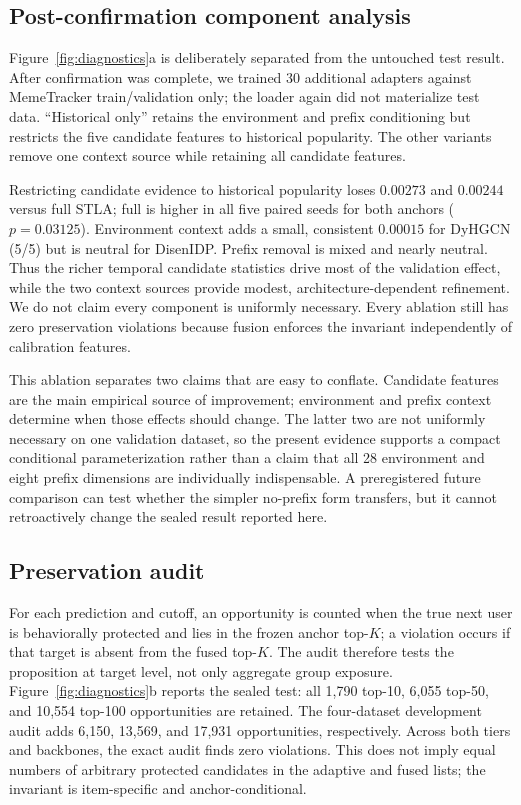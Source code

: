 \documentclass[sigconf,anonymous,review]{acmart}
\newcommand{\method}{\textsc{STLA}\xspace}
\begin{document}
\subsection{Post-confirmation component analysis}
Figure~\ref{fig:diagnostics}a is deliberately separated from the untouched test result. After confirmation was complete, we trained 30 additional adapters against MemeTracker train/validation only; the loader again did not materialize test data. ``Historical only'' retains the environment and prefix conditioning but restricts the five candidate features to historical popularity. The other variants remove one context source while retaining all candidate features.

Restricting candidate evidence to historical popularity loses $0.00273$ and $0.00244$ versus full \method; full is higher in all five paired seeds for both anchors ($p=0.03125$). Environment context adds a small, consistent $0.00015$ for DyHGCN (5/5) but is neutral for DisenIDP. Prefix removal is mixed and nearly neutral. Thus the richer temporal candidate statistics drive most of the validation effect, while the two context sources provide modest, architecture-dependent refinement. We do not claim every component is uniformly necessary. Every ablation still has zero preservation violations because fusion enforces the invariant independently of calibration features.

This ablation separates two claims that are easy to conflate. Candidate features are the main empirical source of improvement; environment and prefix context determine when those effects should change. The latter two are not uniformly necessary on one validation dataset, so the present evidence supports a compact conditional parameterization rather than a claim that all 28 environment and eight prefix dimensions are individually indispensable. A preregistered future comparison can test whether the simpler no-prefix form transfers, but it cannot retroactively change the sealed result reported here.

\subsection{Preservation audit}
For each prediction and cutoff, an opportunity is counted when the true next user is behaviorally protected and lies in the frozen anchor top-$K$; a violation occurs if that target is absent from the fused top-$K$. The audit therefore tests the proposition at target level, not only aggregate group exposure. Figure~\ref{fig:diagnostics}b reports the sealed test: all 1,790 top-10, 6,055 top-50, and 10,554 top-100 opportunities are retained. The four-dataset development audit adds 6,150, 13,569, and 17,931 opportunities, respectively. Across both tiers and backbones, the exact audit finds zero violations. This does not imply equal numbers of arbitrary protected candidates in the adaptive and fused lists; the invariant is item-specific and anchor-conditional.
\end{document}
